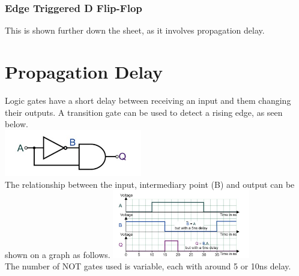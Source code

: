 \documentclass[a4paper,11pt, twocolumn]{article}
\begin{document}
\subsubsection{Edge Triggered D Flip-Flop}
This is shown further down the sheet, as it involves propagation delay.

\section{Propagation Delay}
Logic gates have a short delay between receiving an input and them changing their outputs. A transition gate can be used to detect a rising edge, as seen below.\\
\includegraphics[width=0.45\textwidth]{transGate.jpg}\\
The relationship between the input, intermediary point (B) and output can be shown on a graph as follows.
\includegraphics[width=0.45\textwidth]{transGateDiag.jpg}\\
The number of NOT gates used is variable, each with around 5 or 10ns delay.
\end{document}
